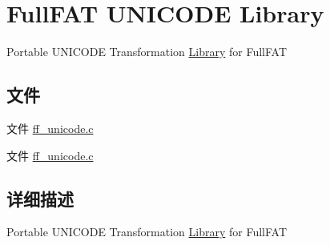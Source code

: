 \hypertarget{group___u_n_i_c_o_d_e}{}\section{Full\+F\+AT U\+N\+I\+C\+O\+DE Library}
\label{group___u_n_i_c_o_d_e}


Portable U\+N\+I\+C\+O\+DE Transformation \hyperlink{struct_library}{Library} for Full\+F\+AT  


\subsection*{文件}
\begin{DoxyCompactItemize}
\item 
文件 \hyperlink{ff__unicode_8c}{ff\+\_\+unicode.\+c}
\item 
文件 \hyperlink{ff__unicode_8c}{ff\+\_\+unicode.\+c}
\end{DoxyCompactItemize}


\subsection{详细描述}
Portable U\+N\+I\+C\+O\+DE Transformation \hyperlink{struct_library}{Library} for Full\+F\+AT 

